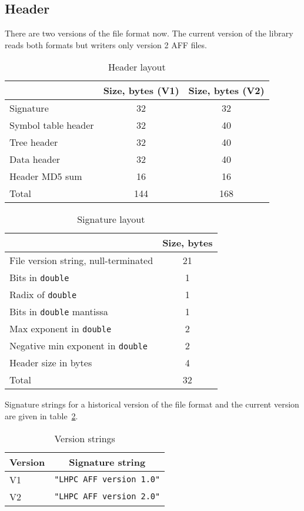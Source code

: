 \documentclass[10pt,letterpaper]{article}
\newcommand{\bc}{\begin{center}}
\newcommand{\ec}{\end{center}}
\newcommand{\ctext}[1]{\texttt{#1}}         %
\begin{document}
\subsection{Header}
There are two versions of the file format now. The current version of the
library reads both formats but writers only version 2 AFF files.
\begin{table}[h]
\bc
\caption{Header layout}\label{tab:header}
\begin{tabular}{|l|c|c|} \hline
 & Size, bytes (V1) & Size, bytes (V2)\\ \hline\hline
Signature & 32 & 32 \\ \hline
Symbol table header & 32 & 40 \\ \hline
Tree header & 32 & 40 \\ \hline
Data header & 32 & 40 \\ \hline
Header MD5 sum & 16 & 16 \\ \hline\hline
Total & 144 & 168 \\ \hline
\end{tabular}
\ec
\end{table}

\begin{table}[h]
\bc
\caption{Signature layout}\label{tab:signature}
\begin{tabular}{|l|c|} \hline
 & Size, bytes \\ \hline\hline
File version string, null-terminated &  21\\ \hline
Bits in \ctext{double} & 1 \\ \hline
Radix of \ctext{double} & 1 \\ \hline
Bits in \ctext{double} mantissa & 1 \\ \hline
Max exponent in \ctext{double} & 2 \\ \hline
Negative min exponent in \ctext{double} & 2 \\ \hline
Header size in bytes & 4 \\ \hline\hline
Total & 32 \\ \hline
\end{tabular}
\ec
\end{table}
Signature strings for a historical version of the file format and the
current version are given in table~\ref{tab:signature}.
\begin{table}[h]
\bc
\caption{Version strings}\label{tab:versions}
\begin{tabular}{|l|c|} \hline
 Version & Signature string \\ \hline\hline
 V1 & \verb|"LHPC AFF version 1.0"| \\ \hline
 V2 & \verb|"LHPC AFF version 2.0"| \\ \hline
\end{tabular}
\ec
\end{table}
\end{document}
